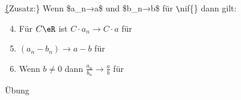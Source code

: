 \ul\{Zusatz:\} Wenn \$a\_n→a\$ und \$b\_n→b\$ für \verb+\+nif\{\} dann gilt:
\begin{enumerate}
\setcounter{enumi}{3}
\item{Für $C\eR$ ist $C·a_n→C·a$ für \nif }%
\item{$(a_n-b_n)→a-b$ für \nif}
\item{Wenn $b\neq 0$ dann $\frac{a_n}{b_n}→\frac{a}{b}$ für \nif}
\end{enumerate}
\bew
Übung